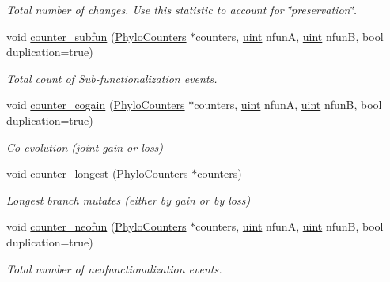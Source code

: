 \begin{Indent}
\begin{DoxyCompactItemize}
\begin{DoxyCompactList}\small\item\em Total number of changes. Use this statistic to account for \char`\"{}preservation\char`\"{}. \end{DoxyCompactList}\item 
void \hyperlink{namespacebarry_1_1counters_1_1phylo_ad36131d4405a758fa200fd29932f49ea}{counter\+\_\+subfun} (\hyperlink{namespacebarry_1_1counters_1_1phylo_a4e401ffe66d04091343dcffaf915f8c3}{Phylo\+Counters} $\ast$counters, \hyperlink{namespacebarry_a11dfc53ddb4672278319aa04f1e09a6c}{uint} nfunA, \hyperlink{namespacebarry_a11dfc53ddb4672278319aa04f1e09a6c}{uint} nfunB, bool duplication=true)
\begin{DoxyCompactList}\small\item\em Total count of Sub-\/functionalization events. \end{DoxyCompactList}\item 
void \hyperlink{namespacebarry_1_1counters_1_1phylo_a002286f13261eb4633c6dc9e6fc1212b}{counter\+\_\+cogain} (\hyperlink{namespacebarry_1_1counters_1_1phylo_a4e401ffe66d04091343dcffaf915f8c3}{Phylo\+Counters} $\ast$counters, \hyperlink{namespacebarry_a11dfc53ddb4672278319aa04f1e09a6c}{uint} nfunA, \hyperlink{namespacebarry_a11dfc53ddb4672278319aa04f1e09a6c}{uint} nfunB, bool duplication=true)
\begin{DoxyCompactList}\small\item\em Co-\/evolution (joint gain or loss) \end{DoxyCompactList}\item 
void \hyperlink{namespacebarry_1_1counters_1_1phylo_ae4ace7c30011a6d7047a94fd0ddf2df2}{counter\+\_\+longest} (\hyperlink{namespacebarry_1_1counters_1_1phylo_a4e401ffe66d04091343dcffaf915f8c3}{Phylo\+Counters} $\ast$counters)
\begin{DoxyCompactList}\small\item\em Longest branch mutates (either by gain or by loss) \end{DoxyCompactList}\item 
void \hyperlink{namespacebarry_1_1counters_1_1phylo_a4cf48d44538ec0646783e29e89027838}{counter\+\_\+neofun} (\hyperlink{namespacebarry_1_1counters_1_1phylo_a4e401ffe66d04091343dcffaf915f8c3}{Phylo\+Counters} $\ast$counters, \hyperlink{namespacebarry_a11dfc53ddb4672278319aa04f1e09a6c}{uint} nfunA, \hyperlink{namespacebarry_a11dfc53ddb4672278319aa04f1e09a6c}{uint} nfunB, bool duplication=true)
\begin{DoxyCompactList}\small\item\em Total number of neofunctionalization events. \end{DoxyCompactList}\item 

\end{DoxyCompactItemize}
\end{Indent}
